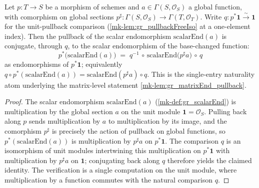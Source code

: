 \begin{lemma}\label{mk-lem:gr_scalarEnd_pullback}
  \leanok

  Let \(p : T \to S\) be a morphism of schemes and \(a \in \Gamma(S, \mathcal{O}_S)\) a
  global function, with comorphism on global sections
  \(p^{\sharp} : \Gamma(S, \mathcal{O}_S) \to \Gamma(T, \mathcal{O}_T)\).
  Write \(q : p^{*}\mathbf{1} \xrightarrow{\sim} \mathbf{1}\) for the unit-pullback comparison
  (\ref{mk-lem:gr_pullbackFreeIso} at a one-element index). Then the pullback of the scalar endomorphism
  \(\mathrm{scalarEnd}(a)\) is conjugate, through \(q\), to the scalar endomorphism of the
  base-changed function:
  \[
    p^{*}\bigl(\mathrm{scalarEnd}(a)\bigr)
      \;=\; q^{-1} \,\circ\, \mathrm{scalarEnd}\bigl(p^{\sharp} a\bigr) \,\circ\, q
  \]
  as endomorphisms of \(p^{*}\mathbf{1}\); equivalently
  \(q \circ p^{*}(\mathrm{scalarEnd}(a)) = \mathrm{scalarEnd}(p^{\sharp} a) \circ q\). This is the
  single-entry naturality atom underlying the matrix-level statement
  \ref{mk-lem:gr_matrixEnd_pullback}.
\end{lemma}
\begin{proof}
  The scalar endomorphism \(\mathrm{scalarEnd}(a)\) (\ref{mk-def:gr_scalarEnd}) is multiplication
  by the global section \(a\) on the unit module \(\mathbf 1 = \mathcal{O}_S\). Pulling back
  along \(p\) sends multiplication by \(a\) to multiplication by its image, and the comorphism
  \(p^{\sharp}\) is precisely the action of pullback on global functions, so
  \(p^{*}(\mathrm{scalarEnd}(a))\) is multiplication by \(p^{\sharp}a\) on \(p^{*}\mathbf 1\). The
  comparison \(q\) is an isomorphism of unit modules intertwining this multiplication on
  \(p^{*}\mathbf 1\) with multiplication by \(p^{\sharp}a\) on \(\mathbf 1\); conjugating back
  along \(q\) therefore yields the claimed identity. The verification is a single computation on
  the unit module, where multiplication by a function commutes with the natural comparison
  \(q\).
\end{proof}

